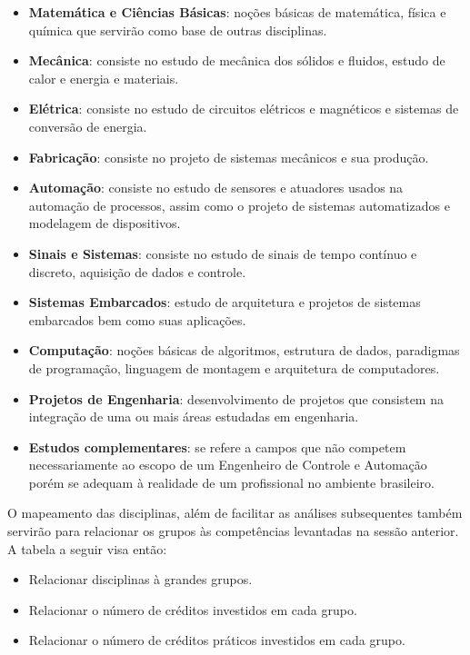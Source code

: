 \documentclass[12pt]{article} %
\begin{document}
\begin{itemize}
\setlength\itemsep{0.01mm}
\item\textbf{Matemática e Ciências Básicas}: noções básicas de matemática, física e química que servirão como base de outras disciplinas.
\item \textbf{Mecânica}: consiste no estudo de mecânica dos sólidos e fluidos, estudo de calor e energia e materiais.
\item \textbf{Elétrica}: consiste no estudo de circuitos elétricos e magnéticos e sistemas de conversão de energia.
\item \textbf{Fabricação}: consiste no projeto de sistemas mecânicos e sua produção.
\item\textbf{Automação}: consiste no estudo de sensores e atuadores usados na automação de processos, assim como o projeto de sistemas automatizados e modelagem de dispositivos.
\item \textbf{Sinais e Sistemas}: consiste no estudo de sinais de tempo contínuo e discreto, aquisição de dados e controle.
\item \textbf{Sistemas Embarcados}: estudo de arquitetura e projetos de sistemas embarcados bem como suas aplicações.
\item\textbf{Computação}: noções básicas de algoritmos, estrutura de dados, paradigmas de programação, linguagem de montagem e arquitetura de computadores.
\item \textbf{Projetos de Engenharia}: desenvolvimento de projetos que consistem na integração de uma ou mais áreas estudadas em engenharia.
\item \textbf{Estudos complementares}: se refere a campos que não competem necessariamente ao escopo de um Engenheiro de Controle e Automação porém se adequam à realidade de um profissional no ambiente brasileiro.
\end{itemize}

O mapeamento das disciplinas, além de facilitar as análises subsequentes também servirão para relacionar os grupos às competências levantadas na sessão anterior.
A tabela a seguir visa então:
\begin{itemize}
\setlength\itemsep{0.01mm}
\item Relacionar disciplinas à grandes grupos.
\item Relacionar o número de créditos investidos em cada grupo.
\item Relacionar o número de créditos práticos investidos em cada grupo.

\end{itemize}
\end{document}
